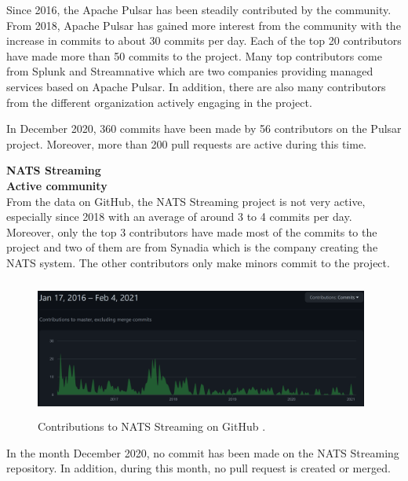 Since 2016, the Apache Pulsar has been steadily contributed by the community. From 2018, Apache Pulsar has gained more interest from the community with the increase in commits to about 30 commits per day. Each of the top 20 contributors have made more than 50 commits to the project. Many top contributors come from Splunk and Streamnative which are two companies providing managed services based on Apache Pulsar. In addition, there are also many contributors from the different organization actively engaging in the project.

In December 2020, 360 commits have been made by 56 contributors on the Pulsar project. Moreover, more than 200 pull requests are active during this time. 

\large \textbf{NATS Streaming}\\
\normalsize
\textbf{Active community}\\
From the data on GitHub, the NATS Streaming project is not very active, especially since 2018 with an average of around 3 to 4 commits per day. Moreover, only the top 3 contributors have made most of the commits to the project and two of them are from Synadia which is the company creating the NATS system. The other contributors only make minors commit to the project. 

\begin{figure}[h]
	\centering
	\includegraphics[width=11cm,height=4.5cm]{images/community-nats.png}
	\caption{Contributions to NATS Streaming on GitHub \cite{natsrepo}.}
	\label{fig:communitynats}
\end{figure}

In the month December 2020, no commit has been made on the NATS Streaming repository. In addition, during this month, no pull request is created or merged. 


